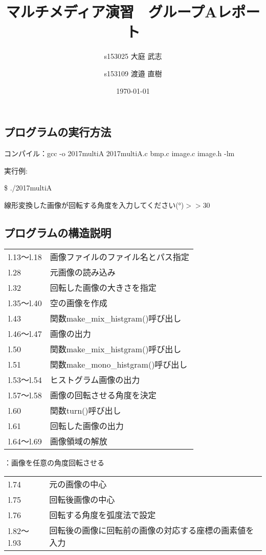 \documentclass{jsarticle}
\title{マルチメディア演習　グループAレポート}
\author{s153025 大庭 武志 \and s153109 渡邉 直樹}
\date{\today}
\begin{document}
\maketitle

\subsection{プログラムの実行方法}

コンパイル：gcc -o 2017multiA 2017multiA.c bmp.c image.c image.h -lm

実行例:

\$ ./2017multiA 

線形変換した画像が回転する角度を入力してください(°)$>>$30

\subsection{プログラムの構造説明}


\begin{table}[H]
    \begin{tabular}{ll}
        l.13〜l.18  & 画像ファイルのファイル名とパス指定\\
        l.28        & 元画像の読み込み\\
        l.32        & 回転した画像の大きさを指定\\
        l.35〜l.40  & 空の画像を作成\\
        l.43        & 関数make\_mix\_histgram()呼び出し\\
        l.46〜l.47  & 画像の出力\\
        l.50        & 関数make\_mix\_histgram()呼び出し\\
        l.51        & 関数make\_mono\_histgram()呼び出し\\
        l.53〜l.54  & ヒストグラム画像の出力\\
        l.57〜l.58  & 画像の回転させる角度を決定\\
        l.60        & 関数turn()呼び出し\\
        l.61        & 回転した画像の出力\\
        l.64〜l.69  & 画像領域の解放\\
    \end{tabular}
\end{table}

：画像を任意の角度回転させる

\begin{table}[H]
    \begin{tabular}{ll}
        l.74        & 元の画像の中心\\
        l.75        & 回転後画像の中心\\
        l.76        & 回転する角度を弧度法で設定\\
        l.82〜l.93  & 回転後の画像に回転前の画像の対応する座標の画素値を入力\\
    \end{tabular}
\end{table}
\end{document}
